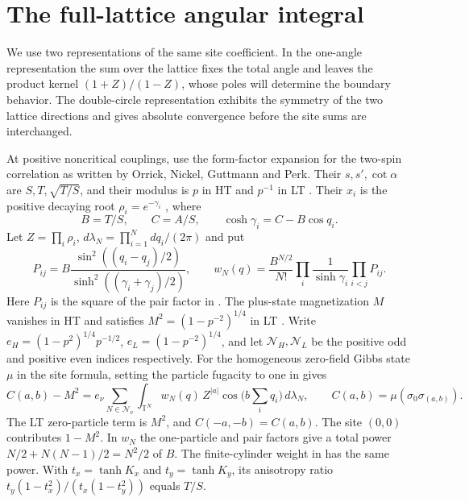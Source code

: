 \documentclass[11pt]{article}
\numberwithin{equation}{section}
\theoremstyle{definition}
\begin{document}
\section{The full-lattice angular integral}\label{sec:physical}

We use two representations of the same site coefficient. In the
one-angle representation the sum over the lattice fixes the total
angle and leaves the product kernel $(1+Z)/(1-Z)$, whose poles will
determine the boundary behavior. The double-circle representation
exhibits the symmetry of the two lattice directions and gives absolute
convergence before the site sums are interchanged.

At positive noncritical couplings, use the form-factor expansion for
the two-spin correlation as written by Orrick, Nickel, Guttmann and Perk.
Their $s,s',\cot\alpha$ are $S,T,\sqrt{T/S}$, and their modulus is $p$
in HT and $p^{-1}$ in LT \cite[(1.2), (1.6), (2.9)]{ONGP}.
Their $x_i$ is the positive decaying root
$\rho_i=e^{-\gamma_i}$ \cite[(3.3), (3.14)--(3.16)]{ONGP}, where
\[
 B=T/S,\qquad C=A/S,\qquad \cosh\gamma_i=C-B\cos q_i .
\]
Let $Z=\prod_i\rho_i$, $d\lambda_N=\prod_{i=1}^N dq_i/(2\pi)$
and put
\[
 P_{ij}=B\frac{\sin^2((q_i-q_j)/2)}{\sinh^2((\gamma_i+\gamma_j)/2)},
 \qquad
 w_N(q)=\frac{B^{N/2}}{N!}\prod_i\frac1{\sinh\gamma_i}\prod_{i<j}P_{ij}.
\]
Here $P_{ij}$ is the square of the pair factor in
\cite[(3.19)--(3.20)]{ONGP}. The plus-state magnetization $M$ vanishes
in HT and satisfies $M^2=(1-p^{-2})^{1/4}$ in LT \cite[(2.2)]{ONGP}.
Write $e_H=(1-p^2)^{1/4}p^{-1/2}$,
$e_L=(1-p^{-2})^{1/4}$, and let $\mathcal N_H,\mathcal N_L$ be the
positive odd and positive even indices respectively. For the
homogeneous zero-field Gibbs state $\mu$ in the site formula, setting
the particle fugacity to one in \cite[(4.1)--(4.2)]{ONGP} gives
\begin{equation}\label{eq:real-site}
 C(a,b)-M^2=e_\nu\sum_{N\in\mathcal N_\nu}
 \int_{\mathbb T^N} w_N(q)\,Z^{|a|}
                 \cos\!\bigl(b\textstyle\sum_i q_i\bigr)\,d\lambda_N,
 \qquad C(a,b)=\mu(\sigma_0\sigma_{(a,b)}).
\end{equation}
The LT zero-particle term is $M^2$, and $C(-a,-b)=C(a,b)$.
The site $(0,0)$ contributes $1-M^2$. In $w_N$ the one-particle and
pair factors give a total power $N/2+N(N-1)/2=N^2/2$ of $B$.
The finite-cylinder weight in \cite[(39)]{BL} has the same power.
With $t_x=\tanh K_x$ and $t_y=\tanh K_y$, its anisotropy ratio
$t_y(1-t_x^2)/(t_x(1-t_y^2))$ equals $T/S$.
\end{document}
